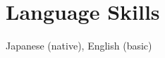 \documentclass[letterpaper,11pt]{article}
\begin{document}
\section{Language Skills}
 \begin{itemize}[leftmargin=0.15in, label={}]
    \small{\item{Japanese (native), English (basic)}}
 \end{itemize}

\end{document}
